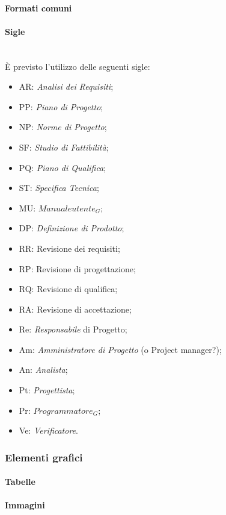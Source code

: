 		\paragraph{Formati comuni}
		
		\paragraph{Sigle} \mbox{} \\
		È previsto l’utilizzo delle seguenti sigle:
		\begin{itemize}
			\item AR: \textit{Analisi dei Requisiti};
			\item PP: \textit{Piano di Progetto};
			\item NP: \textit{Norme di Progetto};
			\item SF: \textit{Studio di Fattibilità};
			\item PQ: \textit{Piano di Qualifica};
			\item ST: \textit{Specifica Tecnica};
			\item MU: \textit{$Manuale utente_G$};	
			\item DP: \textit{Definizione di Prodotto};
			\item RR: Revisione dei requisiti;
			\item RP: Revisione di progettazione;
			\item RQ: Revisione di qualifica;
			\item RA: Revisione di accettazione;
			\item Re: \textit{Responsabile} di Progetto;
			\item Am: \textit{Amministratore di Progetto} (o Project manager?);
			\item An: \textit{Analista};
			\item Pt: \textit{Progettista};
			\item Pr: \textit{$Programmatore_G$};
			\item Ve: \textit{Verificatore}.
		\end{itemize}
		
	\subsubsection{Elementi grafici}
		\paragraph{Tabelle}
		\paragraph{Immagini}
